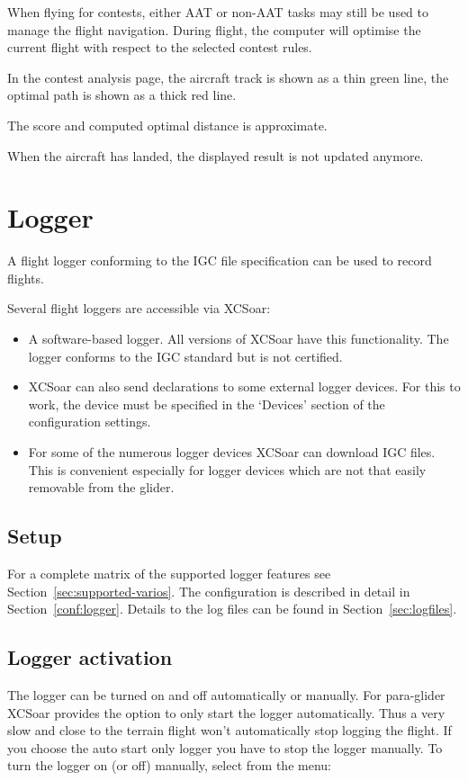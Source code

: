 When flying for contests, either AAT or non-AAT tasks may still be used to
manage the flight navigation.  During flight, the computer will optimise the
current flight with respect to the selected contest rules.

In the contest analysis page, the aircraft track is shown as a thin green line, the optimal
path is shown as a thick red line.

The score and computed optimal distance is approximate.

When the aircraft has landed, the displayed result is not updated anymore.


\section{Logger}\label{sec:logger}

A flight logger conforming to the IGC file specification can be used
to record flights.

Several flight loggers are accessible via XCSoar:
\begin{itemize}
\item A software-based logger.  All versions of XCSoar have this
  functionality.  The logger conforms to the IGC standard but is not
  certified.
\item XCSoar can also send declarations to some external logger devices.
  For this to work, the device must be specified in the `Devices'
  section of the configuration  settings.
\item  For some of the numerous logger devices XCSoar can download IGC files.
  This is convenient especially for logger devices which are not that easily
  removable from the glider.
\end{itemize}

\subsection*{Setup}
For a complete matrix of the supported logger features see Section~\ref{sec:supported-varios}.
The configuration is described in detail in Section~\ref{conf:logger}.  Details
to the log files can be found in Section~\ref{sec:logfiles}.

\subsection*{Logger activation}
The logger can be turned on and off automatically or manually.  For para-glider
XCSoar provides the option to only start the logger automatically. Thus a very
slow and close to the terrain flight won't automatically stop logging the flight.
If you choose the auto start only logger you have to stop the logger manually.
To turn the logger on (or off) manually, select from the menu:
\begin{quote}
\blink{}
\end{quote}

